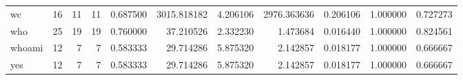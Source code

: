 \begin{tabular}{lrrrrrrrrrr}
wc        &                                      16 &                 11 &                                11 &                                   0.687500 &                            3015.818182 &                                     4.206106 &                       2976.363636 &                                0.206106 &                           1.000000 &                                           0.727273 \\
who       &                                      25 &                 19 &                                19 &                                   0.760000 &                              37.210526 &                                     2.332230 &                          1.473684 &                                0.016440 &                           1.000000 &                                           0.824561 \\
whoami    &                                      12 &                  7 &                                 7 &                                   0.583333 &                              29.714286 &                                     5.875320 &                          2.142857 &                                0.018177 &                           1.000000 &                                           0.666667 \\
yes       &                                      12 &                  7 &                                 7 &                                   0.583333 &                              29.714286 &                                     5.875320 &                          2.142857 &                                0.018177 &                           1.000000 &                                           0.666667 \\
\bottomrule
\end{tabular}

